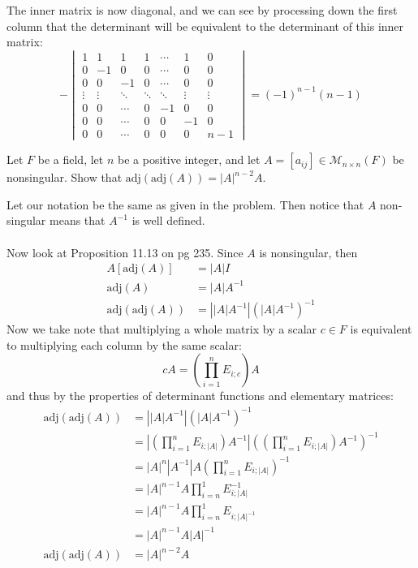 \documentclass{article}
\begin{document}
\begin{solution}
The inner matrix is now diagonal, and we can see by processing down the first column that the determinant will be equivalent to the determinant of this inner matrix:
\[
-
\begin{vmatrix}
1 & 1 & 1 & 1 & \cdots & 1 & 0 \\
0 & -1 & 0 & 0 & \cdots & 0 & 0 \\
0 & 0 & -1 & 0 & \cdots & 0 & 0 \\
\vdots & \vdots & \ddots & \ddots & \ddots & \vdots & \vdots \\
0 & 0 & \cdots & 0 & -1 & 0 & 0 \\ 
0 & 0 & \cdots & 0 & 0 & -1 & 0 \\ 
0 & 0 & \cdots & 0 & 0 & 0 & n-1 
\end{vmatrix}
= (-1)^{n-1}(n-1)
\]

\end{solution}

\setcounter{problem}{682}
\begin{problem}
Let $F$ be a field, let $n$ be a positive integer, and let $A = [a_{ij}] \in \mathcal{M}_{n\times n}(F)$ be nonsingular. Show that $\text{adj}(\text{adj}(A)) = |A|^{n-2}A$.
\end{problem}

\begin{solution}
Let our notation be the same as given in the problem. Then notice that $A$ non-singular means that $A^{-1}$ is well defined. 

\paragraph{}
Now look at Proposition 11.13 on pg 235. Since $A$ is nonsingular, then 
\begin{align*}
A[\text{adj}(A)] &= |A|I \\
\text{adj}(A) &= |A|A^{-1} \\
\text{adj}(\text{adj}(A)) &= \left| |A|A^{-1} \right| (|A|A^{-1})^{-1}
\end{align*}
Now we take note that multiplying a whole matrix by a scalar $c\in F$ is equivalent to multiplying each column by the same scalar:
\[
cA = \left( \prod_{i=1}^{n} E_{i;c} \right)A
\]
and thus by the properties of determinant functions and elementary matrices:
\begin{align*}
\text{adj}(\text{adj}(A)) &= \left| |A|A^{-1} \right| (|A|A^{-1})^{-1} \\
&= \left| \left( \prod_{i=1}^{n} E_{i;|A|} \right)A^{-1} \right| (\left( \prod_{i=1}^{n} E_{i;|A|} \right)A^{-1})^{-1} \\
&= |A|^{n}|A^{-1}| A \left(\prod_{i=1}^{n} E_{i;|A|}\right)^{-1} \\
&= |A|^{n-1} A \prod_{i=n}^{1} E_{i;|A|}^{-1} \\
&= |A|^{n-1} A \prod_{i=n}^{1} E_{i;|A|^{-1}} \\
&= |A|^{n-1} A |A|^{-1} \\
\text{adj}(\text{adj}(A)) &= |A|^{n-2} A
\end{align*}
\end{solution}
\end{document}
